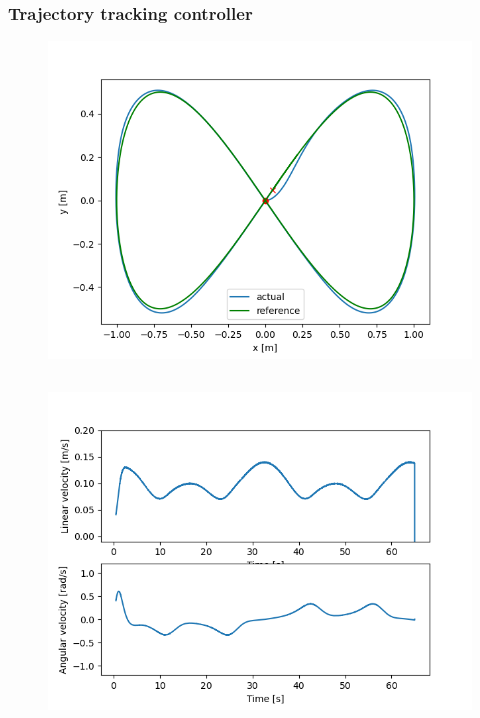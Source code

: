 \documentclass{beamer}
\begin{document}
\begin{frame}[allowframebreaks]
\frametitle{Trajectory tracking controller}

\vspace{-2em}

\begin{figure}[H]
    \centering
    \includegraphics[scale=0.6]{img/kin_screenshots/Trajectory.png}
\end{figure}

\framebreak

\begin{columns}


\vspace{-2em}

\begin{figure}[H]
    \centering
    \includegraphics[scale=0.3]{img/kin_screenshots/Linear_and_Angular_Velocities.png}
\end{figure}


\end{columns}
\end{frame}
\end{document}
